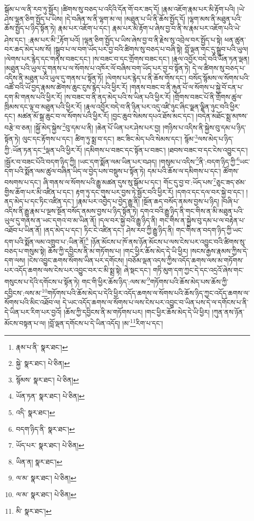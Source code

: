 སྒོམ་པ་ལ་ནི་རབ་ཏུ་སྦྱོར། །ཚིགས་སུ་བཅད་པ་འདིའི་དོན་གོ་བར་ཟད་དོ། །རྣམ་འཇོག་རྣམ་པར་མི་རྟོག་པའི། །ཡེ་ཤེས་ལྷན་ཅིག་སྤྱོད་པ་ཡིས། །དེ་བཞིན་ས་ནི་ལྷག་མ་ལ། །མཐུན་པ་ཡི་ནི་ཆོས་སྤྱོད་དོ། །ལྷག་མས་ནི་མཐུན་པའི་ཆོས་སྤྱོད་པ་ཉིད་སྟོན་ཏེ། རྣམ་པར་འཇོག་པ་དང་། རྣམ་པར་མི་རྟོག་པ་ཞེས་བྱ་བ་ནི་ས་རྣམ་པར་འཇོག་པའི་ཡེ་ཤེས་དང་། :རྣམ་པར་མི་\footnote{རྣམ་པ་ནི་  སྣར་ཐང་། }རྟོག་པའོ། །ལྷན་ཅིག་སྤྱོད་པ་ཡིས་ཞེས་བྱ་བ་ནི་རྗེས་སུ་འབྲེལ་བར་སྤྱོད་པ་སྟེ། ཕན་ཚུན་བར་ཆད་མེད་པས་སོ། །སྒྲུབ་པ་ལ་བག་ཡོད་པར་བྱ་བའི་ཚིགས་སུ་བཅད་པ་བཞི་སྟེ། བློ་ལྡན་གང་དུ་སྒྲུབ་པའི་ཡུལ། །ལེགས་པར་རྙེད་དང་གནས་བཟང་དང་། །ས་བཟང་བ་དང་གྲོགས་བཟང་དང་། །རྣལ་འབྱོར་བདེ་བའི་ཡོན་ཏན་ལྡན། །མཐུན་པའི་ཡུལ་དུ་གནས་པ་ལ་སོགས་པ་འཁོར་ལོ་བཞིས་བག་ཡོད་པར་བྱ་བ་སྟོན་ཏེ། དེ་ལ་ཚིགས་སུ་བཅད་པ་འདིས་ནི་མཐུན་པའི་ཡུལ་དུ་གནས་པ་སྟོན་ཏོ། །ལེགས་པར་རྙེད་པ་ནི་ཆོས་གོས་དང་། བསོད་སྙོམས་ལ་སོགས་པའི་འཚོ་བའི་ཡོ་བྱད་རྣམས་ཚེགས་ཆུང་ངུས་རྙེད་པའི་ཕྱིར་རོ། །གནས་བཟང་བ་ནི་རྐུན་པོ་ལ་སོགས་པ་སྐྱེ་བོ་ངན་པ་དག་མི་གནས་པའི་ཕྱིར་རོ། །ས་བཟང་བ་ནི་ནད་མེད་པའི་ས་ཡིན་པའི་ཕྱིར་རོ། །གྲོགས་བཟང་པོ་ནི་གྲོགས་ཚུལ་ཁྲིམས་དང་ལྟ་བ་མཐུན་པའི་ཕྱིར་རོ། །རྣལ་འབྱོར་བདེ་བ་ནི་ཉིན་པར་འདུ་འཛི་ཉུང་ཞིང་ལྗན་ལྗིན་ཉུང་བའི་ཕྱིར་དང་། མཚན་མོ་སྒྲ་ཆུང་བ་ལ་སོགས་པའི་ཕྱིར་རོ། །བྱང་ཆུབ་སེམས་དཔའ་ཐོས་མང་དང་། །བདེན་མཐོང་སྨྲ་མཁས་བརྩེ་བ་ཅན། །སྐྱོ་མེད་སྐྱེས་\footnote{སྐྱེ་  སྣར་ཐང་།  པེ་ཅིན། }བུ་དམ་པ་ནི། །ཆེན་པོ་ཡིན་པར་ཤེས་པར་བྱ། །གཉིས་པ་འདིས་ནི་སྐྱེས་བུ་དམ་པ་ཉིད་སྟོན་ཏེ། ལུང་དང་རྟོགས་པ་དང་། ཚིག་ཏུ་སྨྲ་བ་དང་། ཟང་ཟིང་མེད་པའི་སེམས་དང་། སྙོམ་\footnote{སྙོམས་  སྣར་ཐང་།  པེ་ཅིན། }ལས་མེད་པ་ཉིད་ཀྱི་:ཡོན་ཏན་དང་\footnote{ཡོན་ཏན་  སྣར་ཐང་།  པེ་ཅིན། }ལྡན་པའི་ཕྱིར་རོ། །དམིགས་པ་བཟང་དང་སྟོན་པ་བཟང་། །ཐབས་བཟང་བ་དང་ངེས་འབྱུང་དང་། །སྦྱོར་བ་བཟང་པོའི་བདག་ཉིད་ཀྱི། །ཡང་དག་སྨོན་ལམ་ཡིན་པར་བཤད། །གསུམ་པ་འདིས་\footnote{འདི་  སྣར་ཐང་། }ནི་:བདག་ཉིད་ཀྱི་\footnote{བདག་ཉིད་ནི་  སྣར་ཐང་། }ཡང་དག་པའི་སྨོན་ལམ་ཚུལ་བཞིན་ཡིད་ལ་བྱེད་པས་བསྡུས་པ་སྟོན་ཏེ། དམ་པའི་ཆོས་ལ་དམིགས་པ་དང་། ཚོགས་བསགས་པ་དང་། ཞི་གནས་ལ་སོགས་པའི་རྒྱུ་མཚན་དུས་སུ་སྒོམ་པ་དང་། གོང་དུ་བྱ་བ་:ཡོད་པས་\footnote{ཡོད་པར་  སྣར་ཐང་།  པེ་ཅིན། }ཅུང་ཟད་ཙམ་གྱིས་ཆོག་པར་མི་འཛིན་པ་དང་། རྟག་ཏུ་དང་གུས་པར་བྱས་ཏེ་སྦྱོར་བའི་ཕྱིར་རོ། །དགའ་དང་དལ་བར་སྐྱེ་བ་དང་། །ནད་མེད་པ་དང་ཏིང་འཛིན་དང་། །རྣམ་པར་འབྱེད་པ་བྱེད་རྒྱུ་ནི། །སྔོན་ཆད་བསོད་ནམས་བྱས་པ་ཉིད། །བཞི་པ་འདིས་ནི་རྒྱུ་རྣམ་པ་ལྔས་སྔོན་བསོད་ནམས་བྱས་པ་ཉིད་སྟོན་ཏེ། དགའ་བའི་རྒྱུ་ཉིད་ནི་གང་གིས་ན་མི་མཐུན་པའི་ཡུལ་དུ་གནས་ན་ཡང་དགའ་བ་མ་ཡིན་ནོ། །དལ་བར་སྐྱེ་བའི་རྒྱུ་ཉིད་ནི། གང་གིས་ན་སྐྱེས་བུ་དམ་པ་ལ་བརྟེན་པ་འཐོབ་པ་ཡིན་ནོ། །ནད་མེད་པ་དང་། ཏིང་ངེ་འཛིན་དང་། ཤེས་རབ་ཀྱི་རྒྱུ་ཉིད་ནི། གང་གིས་ན་བདག་ཉིད་ཀྱི་ཡང་དག་པའི་སྨོན་ལམ་འགྲུབ་པ་:ཡིན་ནོ།\footnote{ཡིན་ན།  སྣར་ཐང་། } །ཉོན་མོངས་པ་ཁོ་ནས་ཉོན་མོངས་པ་ལས་ངེས་པར་འབྱུང་བའི་ཚིགས་སུ་བཅད་པ་གསུམ་སྟེ། ཆོས་ཀྱི་དབྱིངས་ནི་མ་གཏོགས་པ། །གང་ཕྱིར་ཆོས་མེད་དེ་ཡི་ཕྱིར། །སངས་རྒྱས་རྣམས་ཀྱིས་དེ་དག་ལས། །ངེས་འབྱུང་ཆགས་སོགས་ཡིན་པར་དགོངས། །བཅོམ་ལྡན་འདས་ཀྱིས་འདོད་ཆགས་ལས་མ་གཏོགས་པར་འདོད་ཆགས་ལས་ངེས་པར་འབྱུང་བར་ང་མི་སྨྲ་སྟེ། ཞེ་སྡང་དང་། གཏི་མུག་དག་ཀྱང་དེ་དང་འདྲའོ་ཞེས་གང་གསུངས་པ་དེའི་དགོངས་པ་སྟོན་ཏེ། གང་གི་ཕྱིར་ཆོས་ཉིད་:ལས་མ་\footnote{ལ་མ་  སྣར་ཐང་།  པེ་ཅིན། }གཏོགས་པའི་ཆོས་མེད་པས་ཆོས་ཀྱི་དབྱིངས་:ལས་མ་\footnote{ལ་མ་  སྣར་ཐང་།  པེ་ཅིན། }གཏོགས་པའི་ཆོས་མེད་པ་དེའི་ཕྱིར་འདོད་ཆགས་ལ་སོགས་པའི་ཆོས་ཉིད་ཀྱང་འདོད་ཆགས་ལ་སོགས་པའི་མིང་འཐོབ་ལ། དེ་ཡང་འདོད་ཆགས་ལ་སོགས་པ་ལས་ངེས་པར་འབྱུང་བ་ཡིན་པས་དེ་ལ་དགོངས་པ་ནི་དེ་ཡིན་པར་རིག་པར་བྱའོ། །ཆོས་ཀྱི་དབྱིངས་ནི་མ་གཏོགས་པར། །གང་ཕྱིར་ཆོས་མེད་དེ་ཡི་ཕྱིར། །ཀུན་ནས་ཉོན་མོངས་བསྟན་པ་ལ། །བློ་ལྡན་དགོངས་པ་དེ་ཡིན་འདོད། །མ་\footnote{མི་  སྣར་ཐང་། }རིག་པ་དང་། 